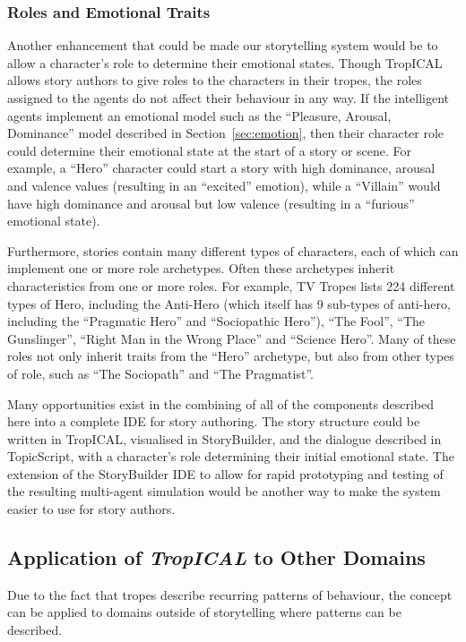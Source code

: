 \documentclass[11pt]{report}
\begin{document}
\subsubsection{Roles and Emotional Traits}
\label{sec:role-emotions}
Another enhancement that could be made our storytelling system would be to allow
a character's role to determine their emotional states.
Though TropICAL allows story authors to give roles to the characters in their
tropes, the roles assigned to the agents do not affect their behaviour in any
way. If the intelligent agents implement an emotional model such as the
``Pleasure, Arousal, Dominance''
model described in Section~\ref{sec:emotion}, then their character role could
determine their emotional state at the start of a story or scene. For example, a
``Hero'' character could start a story with high dominance, arousal and valence
values (resulting in an ``excited'' emotion), while a ``Villain'' would have
high dominance and arousal but low valence (resulting in a ``furious'' emotional
state).

Furthermore, stories contain many different types of characters, each of which can implement
one or more role archetypes. Often these archetypes inherit characteristics from
one or more roles. For example, TV Tropes lists 224 different types of Hero,
including the Anti-Hero (which itself has 9 sub-types of anti-hero, including
the ``Pragmatic Hero'' and ``Sociopathic Hero''), ``The Fool'', ``The
Gunslinger'', ``Right Man in the Wrong Place'' and ``Science Hero''. Many of
these roles not only inherit traits from the ``Hero'' archetype, but also from
other types of role, such as ``The Sociopath'' and ``The Pragmatist''.

Many opportunities exist in the combining of all of the components described
here into a complete IDE for story authoring. The story structure could be
written in TropICAL, visualised in StoryBuilder, and the dialogue described in
TopicScript, with a character's role determining their initial emotional state.
The extension of the StoryBuilder IDE to allow for rapid prototyping and testing
of the resulting multi-agent simulation would be another way to make the system
easier to use for story authors.

\subsection{Application of \emph{TropICAL} to Other Domains}
\label{sec:future-domains}

Due to the fact that tropes describe recurring patterns of behaviour, the concept can be
applied to domains outside of storytelling where patterns can be described.
\end{document}
